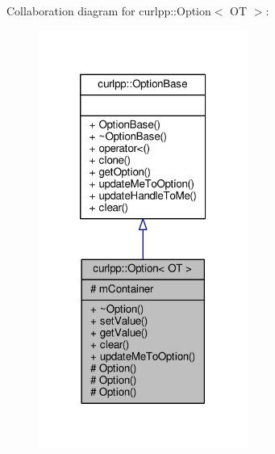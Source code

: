 Collaboration diagram for curlpp\-:\-:Option$<$ O\-T $>$\-:\nopagebreak
\begin{figure}[H]
\begin{center}
\leavevmode
\includegraphics[width=194pt]{classcurlpp_1_1Option__coll__graph}
\end{center}
\end{figure}
